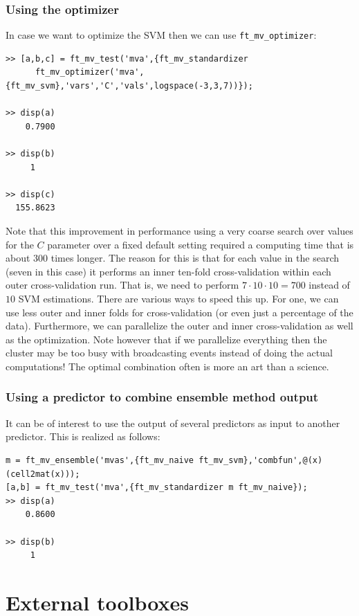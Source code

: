 \documentclass{article}
\renewcommand{\t}[1]{{\tt #1}}
\begin{document}
\subsubsection*{Using the optimizer}

In case we want to optimize the SVM then we can use \t{ft\_mv\_optimizer}:
\begin{verbatim}
>> [a,b,c] = ft_mv_test('mva',{ft_mv_standardizer 
      ft_mv_optimizer('mva',{ft_mv_svm},'vars','C','vals',logspace(-3,3,7))});

>> disp(a)
    0.7900

>> disp(b)
     1

>> disp(c)
  155.8623
\end{verbatim}
Note that this improvement in performance using a very coarse search over values for the $C$ parameter  over a fixed default setting required a computing time that is about  300 times longer. The reason for this is that for each value in the search (seven in this case) it performs an inner ten-fold cross-validation within each outer cross-validation run. That is, we need to perform $7 \cdot 10 \cdot 10=700$ instead of $10$ SVM estimations. There are various ways to speed this up. For one, we can use less outer and inner folds for cross-validation (or even just a percentage of the data). Furthermore, we can parallelize the outer and inner cross-validation as well as the optimization. Note however that if we parallelize everything then the cluster may be too busy with broadcasting events instead of doing the actual computations! The optimal combination often is more an art than a science.

\subsubsection*{Using a predictor to combine ensemble method output}
It can be of interest to use the output of several predictors as input to another predictor. This is realized as follows:
\begin{verbatim}
m = ft_mv_ensemble('mvas',{ft_mv_naive ft_mv_svm},'combfun',@(x)(cell2mat(x)));
[a,b] = ft_mv_test('mva',{ft_mv_standardizer m ft_mv_naive});
>> disp(a)
    0.8600

>> disp(b)
     1
\end{verbatim}


\section{External toolboxes}


\def\refname{}

\end{document}
